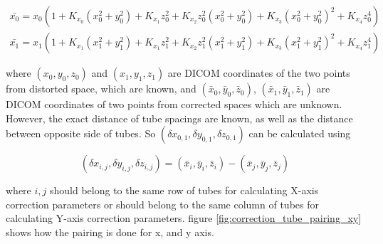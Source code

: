 \begin{eqnarray} \label{eq:xy_setup_sample}
\bar{x_0} = x_0(1 + K_{x_0}(x_0^2 + y_0^2) + K_{x_1}z_0^2 + K_{x_2}z_0^2(x_0^2 + y_0^2) 
+ K_{x_3}(x_0^2 + y_0^2)^2 + K_{x_4}z_0^4)  \\
\bar{x_1} = x_1(1 + K_{x_1}(x_1^2 + y_1^2) + K_{x_1}z_1^2 + K_{x_2}z_1^2(x_1^2 + y_1^2) 
+ K_{x_3}(x_1^2 + y_1^2)^2 + K_{x_4}z_1^4) 
\end{eqnarray}

where $(x_0, y_0, z_0)$ and $(x_1, y_1, z_1)$ are DICOM coordinates of the two points from distorted space, 
which are known, and $(\bar{x}_0, \bar{y}_0, \bar{z}_0)$, $(\bar{x}_1, \bar{y}_1, \bar{z}_1)$ are DICOM 
coordinates of two points from corrected spaces which are unknown. However, the exact distance of tube
spacings are known, as well as the distance between opposite side of tubes. So 
$(\delta{x}_{0,1}, \delta{y}_{0,1}, \delta{z}_{0,1})$ can be calculated using 

\begin{equation}
  (\delta{x}_{i,j}, \delta{y}_{i,j}, \delta{z}_{i,j}) = 
  (\bar{x}_i, \bar{y}_i, \bar{z}_i) - (\bar{x}_j, \bar{y}_j, \bar{z}_j)
\end{equation}

where $i, j$ should belong to the same row of tubes for calculating X-axis correction parameters 
or should belong to the same column of tubes for calculating Y-axis correction parameters. 
figure \ref{fig:correction_tube_pairing_xy} shows how the pairing is done for x, and y axis. 

